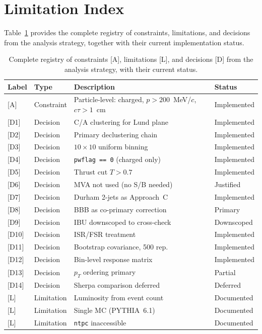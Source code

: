 \documentclass[11pt,a4paper]{article}
\begin{document}
\section{Limitation Index}
\label{app:limitation-index}

Table~\ref{tbl:limitation-index} provides the complete registry of
constraints, limitations, and decisions from the analysis strategy,
together with their current implementation status.

\begin{table}[htbp]
\centering
\caption{Complete registry of constraints [A], limitations [L],
  and decisions [D] from the analysis strategy, with their current
  status.}
\label{tbl:limitation-index}
\begin{tabular}{llp{6cm}l}
\toprule
Label & Type & Description & Status \\
\midrule
{[A]} & Constraint & Particle-level: charged, $p > 200$~MeV/$c$,
  $c\tau > 1$~cm & Implemented \\
{[D1]} & Decision & C/A clustering for Lund plane & Implemented \\
{[D2]} & Decision & Primary declustering chain & Implemented \\
{[D3]} & Decision & $10 \times 10$ uniform binning & Implemented \\
{[D4]} & Decision & \texttt{pwflag == 0} (charged only) & Implemented \\
{[D5]} & Decision & Thrust cut $T > 0.7$ & Implemented \\
{[D6]} & Decision & MVA not used (no S/B needed) & Justified \\
{[D7]} & Decision & Durham 2-jets as Approach~C & Implemented \\
{[D8]} & Decision & BBB as co-primary correction & Primary \\
{[D9]} & Decision & IBU downscoped to cross-check & Downscoped \\
{[D10]} & Decision & ISR/FSR treatment & Implemented \\
{[D11]} & Decision & Bootstrap covariance, 500 rep. & Implemented \\
{[D12]} & Decision & Bin-level response matrix & Implemented \\
{[D13]} & Decision & $p_T$ ordering primary & Partial \\
{[D14]} & Decision & Sherpa comparison deferred & Deferred \\
{[L]} & Limitation & Luminosity from event count & Documented \\
{[L]} & Limitation & Single MC (PYTHIA~6.1) & Documented \\
{[L]} & Limitation & \texttt{ntpc} inaccessible & Documented \\
\bottomrule
\end{tabular}
\end{table}
\end{document}
